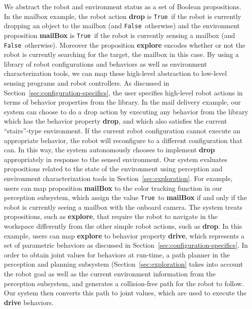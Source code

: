 \documentclass[journal]{IEEEtran}
\newcommand{\lt}{{\tt True }}
\newcommand{\lf}{{\tt False }}
\begin{document}
We abstract the robot and environment status as a set of Boolean propositions.
In the mailbox example, the robot action \textbf{drop} is \lt if the robot is currently dropping an object to the mailbox (and \lf otherwise) and the environment proposition \textbf{mailBox} is \lt if the robot is currently sensing a mailbox (and \lf otherwise).
Moreover the proposition \textbf{explore} encodes whether or not the robot is currently searching for the target, the mailbox in this case.
By using a library of robot configurations and behaviors as well as environment characterization tools, we can map these high-level abstraction to low-level sensing programs and robot controllers.
As discussed in Section~\ref{sec:configuration-specifics}, the user specifies high-level robot actions in terms of behavior properties from the library. 
In the mail delivery example, our system can choose to do a drop action by executing any behavior from the library which has the behavior property \textbf{drop}, and which also satisfies the current ``stairs''-type environment. If the current robot configuration cannot execute an appropriate behavior, the robot will reconfigure to a different configuration that can.  In this way, the system autonomously chooses to implement  \textbf{drop}  appropriately in response to the sensed environment.
Our system evaluates propositions related to the state of the environment using perception and environment characterization tools in Section~\ref{sec:exploration}. For example, users can map proposition \textbf{mailBox} to the color tracking function in our perception subsystem, which assign the value \lt to \textbf{mailBox} if and only if the robot is currently seeing a mailbox with the onboard camera.
The system treats propositions, such as \textbf{explore}, that require the robot to navigate in the workspace differently from the other simple robot actions, such as \textbf{drop}.
In this example, users can map \textbf{explore} to behavior property \textbf{drive}, which represents a set of parametric behaviors as discussed in Section~\ref{sec:configuration-specifics}.
In order to obtain joint values for behaviors at run-time, a path planner in the perception and planning subsystem (Section~\ref{sec:exploration} takes into account the robot goal as well as the current environment information from the perception subsystem, and generates a collision-free path for the robot to follow.
Our system then converts this path to joint values, which are used to execute the \textbf{drive} behaviors.
\end{document}
